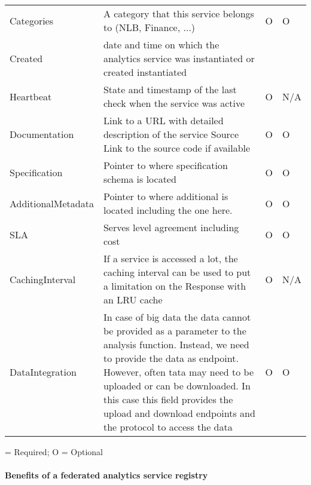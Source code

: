 \begin{table}[htb]
{\begin{tabular}{p{3cm}p{11cm}p{0.5cm}p{0.5cm}}
Categories &	A category that this service belongs to (NLB, Finance, ...)	& O & O \\
Created	& date and time on which the analytics service was instantiated or created	instantiated	& \OK & \OK \\
Heartbeat &	State and timestamp of the last check when the service was active	& O & 	N/A \\
Documentation &	Link to a URL with detailed description of the service
Source	Link to the source code if available	& O & O \\
Specification &	Pointer to where specification schema is located	& O &  O \\
AdditionalMetadata	& Pointer to where additional is located including the one here.	& O &	O \\
SLA	& Serves level agreement including cost	& O 	& O \\
CachingInterval	&If a service is accessed a lot, the caching interval can be used to put a limitation on the Response with an LRU cache	& O &	N/A \\
DataIntegration &	In case of big data the data cannot be provided as a parameter to the analysis function. Instead, we need to provide the data as endpoint. However, often tata may need to be uploaded or can be downloaded. In this case this field provides the upload and download endpoints and the protocol to access the data	& O &	O \\
\hline
\end{tabular}
}
\OK = Required; O = Optional
\end{table}

\paragraph*{Benefits of a federated analytics service registry}

